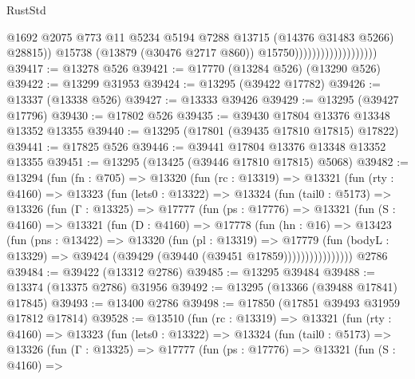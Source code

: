 \begin{lexlean}{RustStd}
\begin{coremodule}
                                              @1692
                                              @2075
                                              @773
                                              @11
                                              @5234
                                              @5194
                                              @7288
                                              @13715
                                              (@14376 @31483 @5266)
                                              @28815))
                                          @15738
                                          (@13879 (@30476 @2717 @860))
                                          @15750)))))))))))))))))))
@39417 := @13278 @526
@39421 := @17770 (@13284 @526) (@13290 @526)
@39422 := @13299 @31953
@39424 := @13295 (@39422 @17782)
@39426 := @13337 (@13338 @526)
@39427 := @13333 @39426
@39429 := @13295 (@39427 @17796)
@39430 := @17802 @526
@39435 := @39430 @17804 @13376 @13348 @13352 @13355
@39440 := @13295 (@17801 (@39435 @17810 @17815) @17822)
@39441 := @17825 @526
@39446 := @39441 @17804 @13376 @13348 @13352 @13355
@39451 := @13295 (@13425 (@39446 @17810 @17815) @5068)
@39482 := @13294
    (fun (fn : @705) =>
    @13320
      (fun (rc : @13319) =>
      @13321
        (fun (rty : @4160) =>
        @13323
          (fun (lets0 : @13322) =>
          @13324
            (fun (tail0 : @5173) =>
            @13326
              (fun (Γ : @13325) =>
              @17777
                (fun (ps : @17776) =>
                @13321
                  (fun (S : @4160) =>
                  @13321
                    (fun (D : @4160) =>
                    @17778
                      (fun (hn : @16) =>
                      @13423
                        (fun (pns : @13422) =>
                        @13320
                          (fun (pl : @13319) =>
                          @17779
                            (fun (bodyL : @13329) =>
                            @39424 (@39429 (@39440 (@39451 @17859))))))))))))))))
    @2786
@39484 := @39422 (@13312 @2786)
@39485 := @13295 @39484
@39488 := @13374 (@13375 @2786) @31956
@39492 := @13295 (@13366 (@39488 @17841) @17845)
@39493 := @13400 @2786
@39498 := @17850 (@17851 @39493 @31959 @17812 @17814)
@39528 := @13510
    (fun (rc : @13319) =>
    @13321
      (fun (rty : @4160) =>
      @13323
        (fun (lets0 : @13322) =>
        @13324
          (fun (tail0 : @5173) =>
          @13326
            (fun (Γ : @13325) =>
            @17777
              (fun (ps : @17776) =>
              @13321
                (fun (S : @4160) =>

\end{coremodule}
\end{lexlean}
